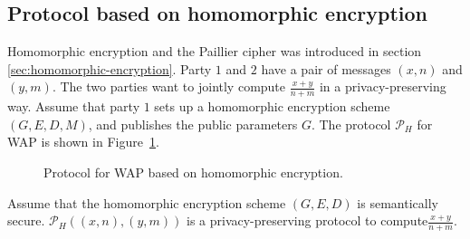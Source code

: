 \subsection{Protocol based on homomorphic encryption}
\label{subsec:homomorphic}

Homomorphic encryption and the Paillier cipher
was introduced in section \ref{sec:homomorphic-encryption}.
Party $1$ and $2$
have a pair of messages $(x,n)$ and $(y,m)$. The two parties want to
jointly compute $\frac{x+y}{n+m}$ in a privacy-preserving way. Assume
that party $1$ sets up a homomorphic encryption scheme $(G,E,D,M)$, and
publishes the public parameters $G$. 
The protocol $\mathcal{P}_H$ for WAP is shown
in Figure~\ref{fig:protocol-homomorphic}.

\begin{figure}
\caption{Protocol for WAP based on homomorphic encryption.}
\label{fig:protocol-homomorphic}
\end{figure}

\begin{theorem}
\label{thm:privacy-homomorphic}
\rm
Assume that the homomorphic encryption scheme $(G,E,D)$ is semantically
secure.
$\mathcal{P}_H((x,n),(y,m))$ is a privacy-preserving
protocol to compute$\frac{x+y}{n+m}$.
\end{theorem}


